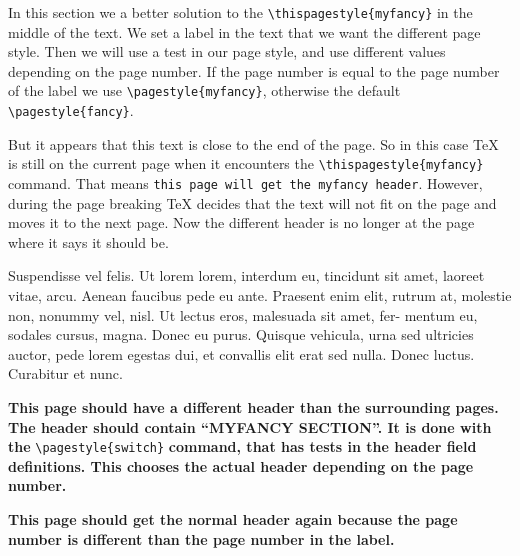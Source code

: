 \documentclass[openany]{book}
\begin{document}
In this section we a better solution to the \verb|\thispagestyle{myfancy}| in the middle of the text. We set a label in the text that we want the different page style. Then we will use a test in our page style, and use different values depending on the page number. If the page number is equal to the page number of the label we use  \verb|\pagestyle{myfancy}|, otherwise the default  \verb|\pagestyle{fancy}|.

But it appears that this text is close to the end of the page. So in this case \TeX{} is still on the current page when it encounters the \verb|\thispagestyle{myfancy}| command. That means \texttt{this page will get the myfancy header}. However, during the page breaking \TeX{} decides that the text will not fit on the page and moves it to the next page. Now the different header is no longer at the page where it says it should be.

\bigskip

\lipsum[6-8]

\bigskip
Suspendisse vel felis. Ut lorem lorem, interdum eu, tincidunt sit amet, laoreet vitae, arcu. Aenean faucibus pede eu ante. Praesent enim elit, rutrum at, molestie non, nonummy vel, nisl. Ut lectus eros, malesuada sit amet, fer- mentum eu, sodales cursus, magna. Donec eu purus. Quisque vehicula, urna sed ultricies auctor, pede lorem egestas dui, et convallis elit erat sed nulla. Donec luctus. Curabitur et nunc. 

\pagestyle{switch}
\noindent
\begin{minipage}{\linewidth}
  \textbf{This page should have a different header than the surrounding
    pages. The header should contain \textnormal{``MYFANCY SECTION''}.
    \label{otherpagestyle}
    It is done with the} \verb|\pagestyle{switch}| \textbf{command, that
    has tests in the header field definitions. This chooses the actual
    header depending on the page number.}
\end{minipage}
\bigskip

\lipsum[8-9]

\newpage

\textbf{This page should get the normal header again because the page number is different than the page number in the label.}
 
\bigskip

\lipsum[10]
\end{document}
